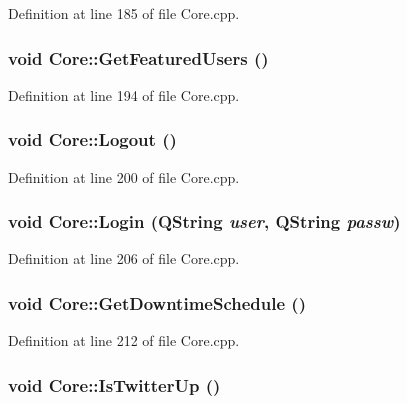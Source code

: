 Definition at line 185 of file Core.cpp.\hypertarget{classCore_c5f77029d34a1427c6b8a491c646e80b}{
\subsubsection{\setlength{\rightskip}{0pt plus 5cm}void Core::GetFeaturedUsers ()}}
\label{classCore_c5f77029d34a1427c6b8a491c646e80b}




Definition at line 194 of file Core.cpp.\hypertarget{classCore_e4ec033e04b6490ac08d6f07507bc9c2}{
\subsubsection{\setlength{\rightskip}{0pt plus 5cm}void Core::Logout ()}}
\label{classCore_e4ec033e04b6490ac08d6f07507bc9c2}




Definition at line 200 of file Core.cpp.\hypertarget{classCore_4570f9ad07c0ba58ce6326eb76568bf6}{
\subsubsection{\setlength{\rightskip}{0pt plus 5cm}void Core::Login (QString {\em user}, \/  QString {\em passw})}}
\label{classCore_4570f9ad07c0ba58ce6326eb76568bf6}




Definition at line 206 of file Core.cpp.\hypertarget{classCore_7ba2a526280dcfc427480956f90f29cb}{
\subsubsection{\setlength{\rightskip}{0pt plus 5cm}void Core::GetDowntimeSchedule ()}}
\label{classCore_7ba2a526280dcfc427480956f90f29cb}




Definition at line 212 of file Core.cpp.\hypertarget{classCore_eeaa4a9429ac0a0dd2c2d11c0c0eea81}{
\subsubsection{\setlength{\rightskip}{0pt plus 5cm}void Core::IsTwitterUp ()}}
\label{classCore_eeaa4a9429ac0a0dd2c2d11c0c0eea81}




